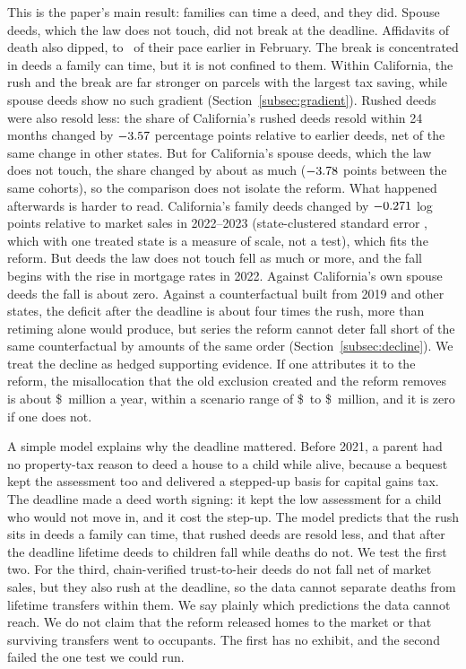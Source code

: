 This is the paper's main result: families can time a deed, and they did. Spouse deeds, which the law does not touch, did not break at the deadline. Affidavits of death also dipped, to \SIVAffidavitDeadlineSign\ of their pace earlier in February. The break is concentrated in deeds a family can time, but it is not confined to them. Within California, the rush and the break are far stronger on parcels with the largest tax saving, while spouse deeds show no such gradient (Section~\ref{subsec:gradient}). Rushed deeds were also resold less: the share of California's rushed deeds resold within 24 months changed by $-3.57$ percentage points relative to earlier deeds, net of the same change in other states. But for California's spouse deeds, which the law does not touch, the share changed by about as much ($-3.78$ points between the same cohorts), so the comparison does not isolate the reform. What happened afterwards is harder to read. California's family deeds changed by $-0.271$ log points relative to market sales in 2022--2023 (state-clustered standard error \SIVMainDDDSE, which with one treated state is a measure of scale, not a test), which fits the reform. But deeds the law does not touch fell as much or more, and the fall begins with the rise in mortgage rates in 2022. Against California's own spouse deeds the fall is about zero. Against a counterfactual built from 2019 and other states, the deficit after the deadline is about four times the rush, more than retiming alone would produce, but series the reform cannot deter fall short of the same counterfactual by amounts of the same order (Section~\ref{subsec:decline}). We treat the decline as hedged supporting evidence. If one attributes it to the reform, the misallocation that the old exclusion created and the reform removes is about \$\WViLossCentral\ million a year, within a scenario range of \$\WViLossLow\ to \$\WViLossHigh\ million, and it is zero if one does not.

A simple model explains why the deadline mattered. Before 2021, a parent had no property-tax reason to deed a house to a child while alive, because a bequest kept the assessment too and delivered a stepped-up basis for capital gains tax. The deadline made a deed worth signing: it kept the low assessment for a child who would not move in, and it cost the step-up. The model predicts that the rush sits in deeds a family can time, that rushed deeds are resold less, and that after the deadline lifetime deeds to children fall while deaths do not. We test the first two. For the third, chain-verified trust-to-heir deeds do not fall net of market sales, but they also rush at the deadline, so the data cannot separate deaths from lifetime transfers within them. We say plainly which predictions the data cannot reach. We do not claim that the reform released homes to the market or that surviving transfers went to occupants. The first has no exhibit, and the second failed the one test we could run.

